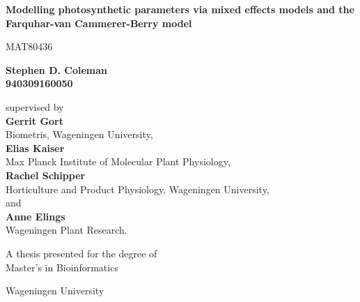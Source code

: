 \documentclass[11pt]{article} %
\author{Stephen D. Coleman}
\begin{document}
 \pgfplotsset{compat=1.15}

\begin{titlepage}
\begin{center}
\vspace*{1cm}

\par{\LARGE \textbf{Modelling photosynthetic parameters via mixed effects models and the Farquhar-van Cammerer-Berry model}}

\vspace{0.5cm}
MAT80436

\vspace{1.5cm}

\textbf{Stephen D. Coleman \\ 940309160050}

\vspace{2.8cm}

supervised by \\
\textbf{Gerrit Gort} \\
Biometris, Wageningen University, \\
\textbf{Elias Kaiser} \\
Max Planck Institute of Molecular Plant Physiology, \\
\textbf{Rachel Schipper} \\
Horticulture and Product Physiology, Wageningen University, \\
and \\
\textbf{Anne Elings} \\
Wageningen Plant Research.



\vfill

A thesis presented for the degree of \\
Master's in Bioinformatics

\vspace{0.8cm}


Wageningen University

\end{center}
\end{titlepage}
\end{document}
